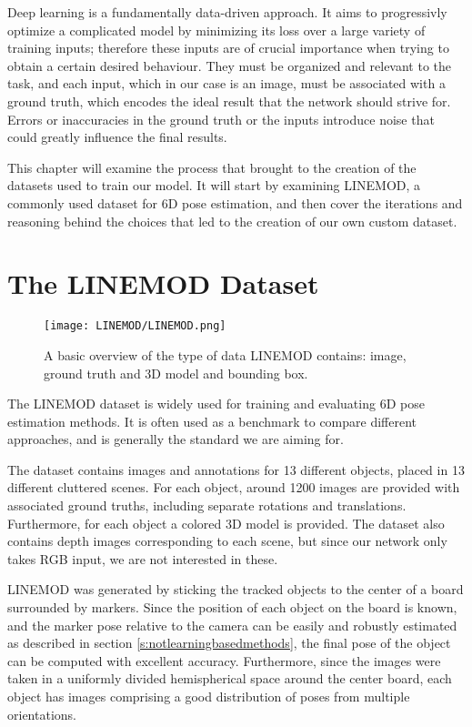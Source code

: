 \label{ch:datasets}

Deep learning is a fundamentally data-driven approach. It aims to progressivly optimize a complicated model by minimizing its loss over a large variety of training inputs; therefore these inputs are of crucial importance when trying to obtain a certain desired behaviour. They must be organized and relevant to the task, and each input, which in our case is an image, must be associated with a ground truth, which encodes the ideal result that the network should strive for. Errors or inaccuracies in the ground truth or the inputs introduce noise that could greatly influence the final results.

This chapter will examine the process that brought to the creation of the datasets used to train our model. It will start by examining LINEMOD\cite{linemod}, a commonly used dataset for 6D pose estimation, and then cover the iterations and reasoning behind the choices that led to the creation of our own custom dataset.

\section{The LINEMOD Dataset}
\label{s:LINEMOD}

\begin{figure}[h]
    \centering
    \texttt{[image: LINEMOD/LINEMOD.png]}
    \caption{A basic overview of the type of data LINEMOD contains: image, ground truth and 3D model and bounding box.}
    \label{fig:linemod}
\end{figure}

The LINEMOD dataset is widely used for training and evaluating 6D pose estimation methods. It is often used as a benchmark to compare different approaches, and is generally the standard we are aiming for.

The dataset contains images and annotations for 13 different objects, placed in 13 different cluttered scenes. For each object, around 1200 images are provided with associated ground truths, including separate rotations and translations. Furthermore, for each object a colored 3D model is provided. The dataset also contains depth images corresponding to each scene, but since our network only takes RGB input, we are not interested in these.

LINEMOD was generated by sticking the tracked objects to the center of a board surrounded by markers. Since the position of each object on the board is known, and the marker pose relative to the camera can be easily and robustly estimated as described in section \ref{s:notlearningbasedmethods}, the final pose of the object can be computed with excellent accuracy. Furthermore, since the images were taken in a uniformly divided hemispherical space around the center board, each object has images comprising a good distribution of poses from multiple orientations.

